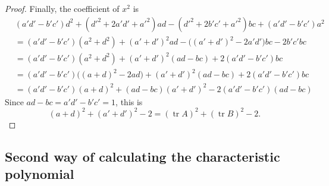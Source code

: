\documentclass[11pt]{amsart}
\theoremstyle{definition}
\numberwithin{figure}{section}
\numberwithin{equation}{section}
\numberwithin{table}{section}
\newcommand{\tr}{\operatorname{tr}}
\begin{document}
\begin{proof}
Finally, the coefficient of $x^2$ is
\begin{align*}
&(a'd'-b'c')d^2 + (d'^2+2a'd'+a'^2)ad -(d'^2+2b'c'+a'^2)bc + (a'd'-b'c')a^2 \\
&=(a'd'-b'c')(a^2+d^2) + (a'+d')^2ad - \big((a'+d')^2-2a'd'\big)bc-2b'c'bc \\
&=(a'd'-b'c')(a^2+d^2) + (a'+d')^2 (ad-bc) + 2(a'd'-b'c')bc \\
&=(a'd'-b'c')\big((a+d)^2-2ad\big) + (a'+d')^2 (ad-bc) + 2(a'd'-b'c')bc \\
&=(a'd'-b'c')(a+d)^2+(ad-bc)(a'+d')^2 - 2(a'd'-b'c')(ad-bc)
\end{align*}
Since $ad-bc=a'd'-b'c'=1$, this is
\[
(a+d)^2+(a'+d')^2-2 = (\tr{A})^2+(\tr{B})^2-2.
\]
\end{proof}

\subsection{Second way of calculating the characteristic polynomial}
\end{document}
